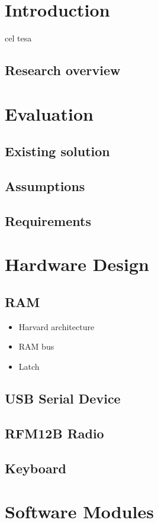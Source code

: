\chapter{Introduction}
cel
tesa
\section{Research overview}

\chapter{Evaluation}
\section{Existing solution}
\section{Assumptions}
\section{Requirements}

\chapter{Hardware Design}
\section{RAM}
\begin{itemize}
\item Harvard architecture
\item RAM bus
\item Latch
\end{itemize}
\section{USB Serial Device}
\section{RFM12B Radio}
\section{Keyboard}

\chapter{Software Modules}
